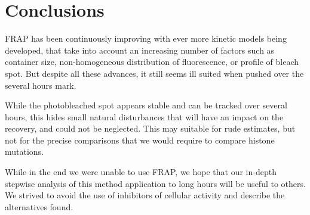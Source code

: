 


\section{Conclusions}

  FRAP has been continuously improving with ever more kinetic models being
  developed, that take into account an increasing number of factors such
  as container size, non-homogeneous distribution of fluorescence, or profile
  of bleach spot. But despite all these advances, it still seems ill suited
  when pushed over the several hours mark.

  While the photobleached spot appears stable and can be tracked over
  several hours, this hides small natural disturbances that will have
  an impact on the recovery, and could not be neglected.
  This may suitable for rude estimates, but not for the precise
  comparisons that we would require to compare histone mutations.

  While in the end we were unable to use FRAP, we hope that our in-depth
  stepwise analysis of this method application to long hours will be useful
  to others. We strived to avoid the use of inhibitors of cellular activity
  and describe the alternatives found.



